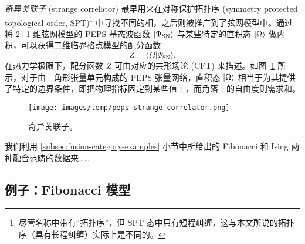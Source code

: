 \emph{奇异关联子} (strange correlator) 最早用来在对称保护拓扑序 (symmetry protected topological order, SPT)\footnote{尽管名称中带有“拓扑序”，但 SPT 态中只有短程纠缠，这与本文所说的拓扑序（具有长程纠缠）实际上是不同的。} 中寻找不同的相\cite{you2014wave}，之后则被推广到了弦网模型中\cite{vanhove2018mapping,lootens2019cardy,vanhove2022topological}。通过将 2+1 维弦网模型的 PEPS 基态波函数 $\ket{\Psi_\text{SN}}$ 与某些特定的直积态 $\ket{\Omega}$ 做内积，可以获得二维临界格点模型的配分函数
\begin{equation}
  Z = \langle\Omega|\Psi_\text{SN}\rangle.
\end{equation}
在热力学极限下，配分函数 $Z$ 可由对应的共形场论 (CFT) 来描述。如图~\ref{fig:peps-strange-correlator} 所示，对于由三角形张量单元构成的 PEPS 张量网络，直积态 $\ket{\Omega}$ 相当于为其提供了特定的边界条件，即把物理指标固定到某些值上，而角落上的自由度则需求和。

\begin{figure}[htb]
  \centering
  \texttt{[image: images/temp/peps-strange-correlator.png]}
  \caption[奇异关联子]{奇异关联子。}
  \label{fig:peps-strange-correlator}
\end{figure}

我们利用 \ref{subsec:fusion-category-examples} 小节中所给出的 Fibonacci 和 Ising 两种融合范畴的数据来……

\subsection{例子：Fibonacci 模型}

